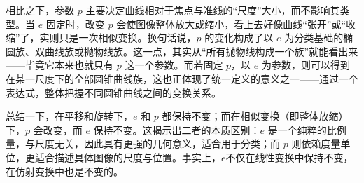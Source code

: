 相比之下，参数 $p$ 主要决定曲线相对于焦点与准线的“尺度”大小，而不影响其类型。当 $e$ 固定时，改变 $p$ 会使图像整体放大或缩小，看上去好像曲线“张开”或“收缩”了，实则只是一次相似变换。换句话说，$p$ 的变化构成了以 $e$ 为分类基础的椭圆族、双曲线族或抛物线族。这一点，其实从“所有抛物线构成一个族”就能看出来——毕竟它本来也就只有 $p$ 这一个参数。而若固定 $p$，以 $e$ 为参数，则可以得到在某一尺度下的全部圆锥曲线族，这也正体现了统一定义的意义之一——通过一个表达式，整体把握不同圆锥曲线之间的变换关系。

总结一下，在平移和旋转下，$e$ 和 $p$ 都保持不变；而在相似变换（即整体放缩）下，$p$ 会改变，而 $e$ 保持不变。这揭示出二者的本质区别：$e$ 是一个纯粹的比例量，与尺度无关，因此具有更强的几何意义，适合用于分类；而 $p$ 则依赖度量单位，更适合描述具体图像的尺度与位置。事实上，$e$不仅在线性变换中保持不变，在仿射变换中也是不变的。
